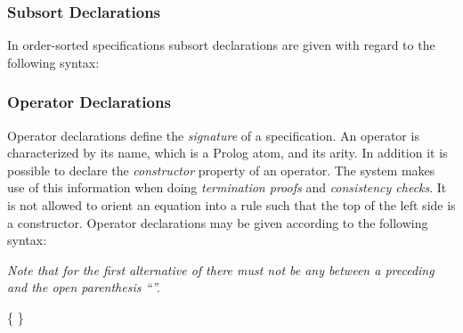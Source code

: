 {\subsubsection{Subsort Declarations}
\label{subsortdecl}

In order-sorted specifications subsort declarations are given 
with regard to the following syntax: 

\begin{syntax}
 \IS {} \kw{<}   \END
{}           \IS {}
\end{syntax}

\subsubsection{Operator Declarations}
\label{operators}

Operator declarations define the {\em signature} of a specification. 
An operator is characterized by its name, which is a Prolog atom, and
its arity.
In addition it is 
possible to declare the {\em constructor} property of an operator. The system
makes use of this information when doing {\em termination proofs} and
{\em consistency checks}. It is not allowed to orient an equation into a rule
such that the top of the left side is a constructor.
Operator declarations may be given according to the following syntax: 

\begin{syntax}
 \IS {}  \kw{:}  \END
{} \IS {} \ts {} \END
{} \IS \kw{(} \kw{,} \kw{,}  \kw{)}
 \OR {}
 \OR {}
\end{syntax}

\noindent
{\em Note that for the first alternative of  there must not be
 any 
between a preceding  and the open parenthesis ``\kw{(}''. }

\begin{syntax}
 \IS {} \END
{} \IS {} \ts {} \ts {} \ts {} 
              \ts {} \ts {} \ts {} \END
{} \IS {} 
 	  \OR \kw{(}  \kw{->}  \kw{)} \END
{} \IS {} \{ \kw{*}  \} \END
{}    \IS {}\END
{}      \IS {} \END
\end{syntax}

}
